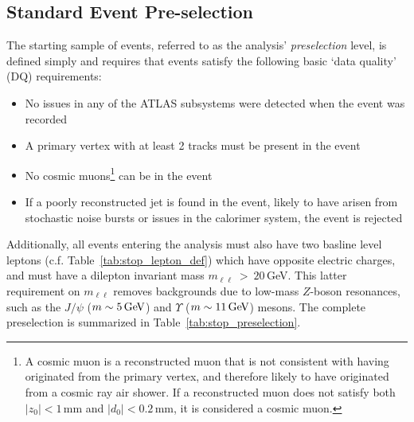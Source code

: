 \subsection{Standard Event Pre-selection}
\label{sec:stop_preselection}

The starting sample of events, referred to as the analysis' \textit{preselection} level,
is defined simply and requires that events satisfy the following basic `data quality' (DQ) requirements:

\begin{itemize}
    \item No issues in any of the ATLAS subsystems were detected when the event was recorded
    \item A primary vertex with at least 2 tracks must be present in the event
    \item No cosmic muons\footnote{A cosmic muon is a reconstructed muon that is not consistent with
        having originated from the primary vertex, and therefore likely to have originated from
        a cosmic ray air shower.
        If a reconstructed muon does not satisfy both $|z_0| < 1$\,mm and $|d_0|<0.2$\,mm, it is considered
        a cosmic muon.} can be in the event
    \item If a poorly reconstructed jet is found in the event, likely to have arisen from stochastic
        noise bursts or issues in the calorimer system, the event is rejected
\end{itemize}

Additionally, all events entering the analysis must also have two basline level leptons (c.f. Table~\ref{tab:stop_lepton_def})
which have opposite electric charges, and must have a dilepton invariant mass $m_{\ell \ell}~>~20$\,GeV.
This latter requirement on $m_{\ell\ell}$ removes backgrounds due to low-mass $Z$-boson resonances, such as the $J/\psi$ ($m \sim 5\,\text{Ge\kern -0.1em V}$)
and $\Upsilon$ ($m \sim 11\,\text{Ge\kern -0.1em V}$) mesons. The complete preselection is summarized in Table~\ref{tab:stop_preselection}.


